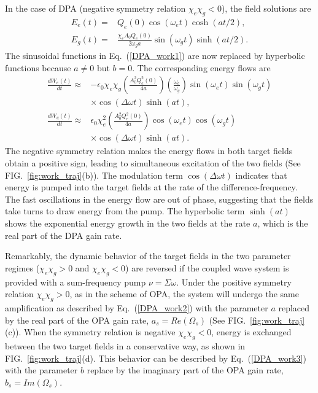 \documentclass[aps,prl,nobibnotes,nofootinbib,showpacs,reprint]{revtex4-1}
\newcommand{\Fig}[1]{FIG.~\ref{#1}}
\newcommand{\Eq}[1]{Eq.~(\ref{#1})}
\newcommand{\we}{\omega_{e}}
\newcommand{\wg}{\omega_{g}}
\newcommand{\chie}{\chi_{e}}
\newcommand{\chig}{\chi_{g}}
\newcommand{\Dw}{\Delta \omega}
\newcommand{\Sw}{\Sigma \omega}
\newcommand{\Wms}{\Omega_{s}}
\begin{document}
In the case of DPA (negative symmetry relation $\chie\chig < 0$), the field solutions are
\begin{equation}
	\begin{split}
	E_{e}(t) =& Q_{e}(0)\cos{(\we t)}\cosh{(at/2)},		\\
	E_{g}(t) =& \frac{\chie A_{0}Q_{e}(0)}{2\wg a}\sin{(\wg t)}\sinh{(at/2)}.
	\end{split}
\end{equation}
The sinusoidal functions in  \Eq{DPA_work1} are now replaced by hyperbolic functions because $a \neq 0$ but $b = 0$. The corresponding energy flows are 
\begin{equation}
	\begin{split}\label{DPA_work2}
	\frac{dW_{e}(t)}{dt} \approx& -\epsilon_{0}\chie\chig \left( \frac{A_{0}^2 Q_{e}^2(0)}{4a} \right) \left( \frac{\we}{\wg} \right) \sin{\left( \we t \right)}\sin{\left( \wg t \right)}	\\
					& \times \cos{\left(\Dw t \right)}\sinh{\left( a t\right)},	\\
	\frac{dW_{g}(t)}{dt} \approx& \epsilon_{0}\chie^2 \left( \frac{A_{0}^2 Q_{e}^2(0)}{4a} \right) \cos{\left( \we t \right)}\cos{\left( \wg t \right)}	\\
					& \times \cos{\left(\Dw t \right)}\sinh{\left( a t\right)}	.
	\end{split}
\end{equation}
The negative symmetry relation makes the energy flows in both target fields obtain a positive sign, leading to simultaneous excitation of the two fields (See \Fig{fig:work_traj}(b)). The modulation term $\cos{\left( \Dw t \right)}$ indicates that energy is pumped into the target fields at the rate of the difference-frequency. The fast oscillations in the energy flow are out of phase, suggesting that the fields take turns to draw energy from the pump. The hyperbolic term $\sinh{\left( a t\right)}$ shows the exponential energy growth in the two fields at the rate $a$, which is the real part of the DPA gain rate. 

Remarkably, the dynamic behavior of the target fields in the two parameter regimes ($\chie\chig > 0$ and $\chie\chig <0$) are reversed if the coupled wave system is provided with a sum-frequency pump $\nu = \Sw$. Under the positive symmetry relation $\chie\chig > 0$, as in the scheme of OPA, the system will undergo the same amplification as described by \Eq{DPA_work2} with the parameter $a$ replaced by the real part of the OPA gain rate, $a_{s} = Re(\Wms)$ (See \Fig{fig:work_traj}(c)). When the symmetry relation is negative $\chie\chig < 0$, energy is exchanged between the two target fields in a conservative way, as shown in \Fig{fig:work_traj}(d). This behavior can be described by \Eq{DPA_work3} with the parameter $b$ replace by the imaginary part of the OPA gain rate, $b_{s} = Im(\Wms)$. 
\end{document}
